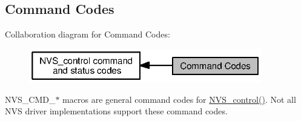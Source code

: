 \subsection{Command Codes}
\label{group___n_v_s___c_m_d}
Collaboration diagram for Command Codes\+:
\nopagebreak
\begin{figure}[H]
\begin{center}
\leavevmode
\includegraphics[width=287pt]{group___n_v_s___c_m_d}
\end{center}
\end{figure}
N\+V\+S\+\_\+\+C\+M\+D\+\_\+$\ast$ macros are general command codes for \hyperlink{_n_v_s_8h_adb26bd05e4f063191411ac5ad968b1d9}{N\+V\+S\+\_\+control()}. Not all N\+V\+S driver implementations support these command codes. 